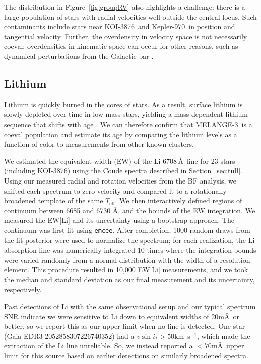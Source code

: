 \documentclass[twocolumn, linenumbers]{aastex631}
\newcommand{\association}{MELANGE-3}
\newcommand{\name}{KOI-3876}
\newcommand{\starname}{KOI-3876}
\newcommand{\starnametwo}{Kepler-970}
\newcommand{\vsini}{$v\sin{i_*}$}
\newcommand{\teff}{\ensuremath{T_{\text{eff}}}}
\newcommand\kms{km~s$^{-1}$}
\begin{document}
The distribution in Figure~\ref{fig:groupRV} also highlights a challenge: there is a large population of stars with radial velocities well outside the central locus. Such contaminants include stars near \starname\ and \starnametwo\ in position and tangential velocity. Further, the overdensity in velocity space is not necessarily coeval; overdensities in kinematic space can occur for other reasons, such as dynamical perturbations from the Galactic bar \citep{2010ApJ...717..617B}. 


\subsection{Lithium}\label{sec:lithium}

Lithium is quickly burned in the cores of stars. As a result, surface lithium is slowly depleted over time in low-mass stars, yielding a mass-dependent lithium sequence that shifts with age \citep[e.g.,][]{2017MNRAS.464.1456J, 2017AJ....153..128C}. We can therefore confirm that \association\ is a coeval population and estimate its age by comparing the lithium levels as a function of color to measurements from other known clusters. 

We estimated the equivalent width (EW) of the Li 6708\,\AA\ line for 23 stars (including \name) using the Coude spectra described in Section~\ref{sec:tull}. Using our measured radial and rotation velocities from the BF analysis, we shifted each spectrum to zero velocity and compared it to a rotationally broadened template of the same \teff. We then interactively defined regions of continuum between 6685 and 6730 \AA, and the bounds of the EW integration. We measured the EW[Li] and its uncertainty using a bootstrap approach. The continuum was first fit using {\tt emcee}. After completion, 1000 random draws from the fit posterior were used to normalize the spectrum; for each realization, the Li absorption line was numerically integrated 10 times where the integration bounds were varied randomly from a normal distribution with the width of a resolution element. This procedure resulted in 10,000 EW[Li] measurements, and we took the median and standard deviation as our final measurement and its uncertainty, respectively.  

Past detections of Li with the same observational setup and our typical spectrum SNR indicate we were sensitive to Li down to equivalent widths of 20m\AA\ or better, so we report this as our upper limit when no line is detected. One star (Gaia EDR3 2052858307226740352) had a \vsini$>50$\kms, which made the extraction of the Li line unreliable. So, we instead reported a $<70$m\AA\ upper limit for this source based on earlier detections on similarly broadened spectra. 
\end{document}
